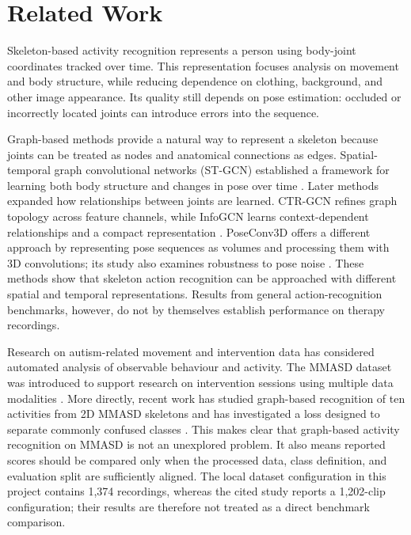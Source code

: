 
\section{Related Work}\label{sec:related_work}

Skeleton-based activity recognition represents a person using body-joint coordinates tracked over time. This representation focuses analysis on movement and body structure, while reducing dependence on clothing, background, and other image appearance. Its quality still depends on pose estimation: occluded or incorrectly located joints can introduce errors into the sequence.

Graph-based methods provide a natural way to represent a skeleton because joints can be treated as nodes and anatomical connections as edges. Spatial-temporal graph convolutional networks (ST-GCN) established a framework for learning both body structure and changes in pose over time \cite{yan2018stgcn}. Later methods expanded how relationships between joints are learned. CTR-GCN refines graph topology across feature channels, while InfoGCN learns context-dependent relationships and a compact representation \cite{Chen2021CTR,Chi2022InfoGCN}. PoseConv3D offers a different approach by representing pose sequences as volumes and processing them with 3D convolutions; its study also examines robustness to pose noise \cite{Duan2022PoseConv3D}. These methods show that skeleton action recognition can be approached with different spatial and temporal representations. Results from general action-recognition benchmarks, however, do not by themselves establish performance on therapy recordings.

Research on autism-related movement and intervention data has considered automated analysis of observable behaviour and activity. The MMASD dataset was introduced to support research on intervention sessions using multiple data modalities \cite{li2023mmasd}. More directly, recent work has studied graph-based recognition of ten activities from 2D MMASD skeletons and has investigated a loss designed to separate commonly confused classes \cite{Ay2026RCProtoGCN}. This makes clear that graph-based activity recognition on MMASD is not an unexplored problem. It also means reported scores should be compared only when the processed data, class definition, and evaluation split are sufficiently aligned. The local dataset configuration in this project contains 1,374 recordings, whereas the cited study reports a 1,202-clip configuration; their results are therefore not treated as a direct benchmark comparison.

